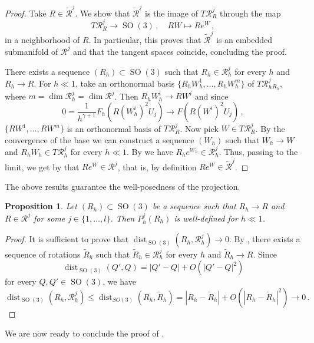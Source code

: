 \documentclass{article}
\theoremstyle{plain}
\theoremstyle{plain}
\theoremstyle{plain}
\theoremstyle{plain}
\theoremstyle{plain}
\newtheorem{prop}[teo]{Proposition}
\theoremstyle{definition}
\theoremstyle{definition}
\DeclareMathOperator{\SO}{SO}
\DeclareMathOperator{\dist}{dist}
\begin{document}
\begin{proof}
	Take $R \in \tilde{\mathcal{R}}^j$. We show that $\tilde{\mathcal{R}}^j$ is the image of $T\mathcal{R}^j_R$ through the map
	\[
		T\mathcal{R}^j_R \to \SO(3)\,, \quad RW \mapsto Re^W\,,
	\]
	in a neighborhood of $R$. In particular, this proves that $\tilde{\mathcal{R}}^j$ is an embedded submanifold of $\mathcal{R}^j$ and that the tangent spaces coincide, concluding the proof. 
	
	There exists a sequence $(R_h) \subset \SO(3)$ such that $R_h \in \mathcal{R}_h^j$ for every $h$ and $R_h \to R$. For $h \ll 1$, take an orthonormal basis $\{R_hW^1_h, \dots, R_hW^m_h\}$ of $T \mathcal{R}_h^j{}_{R_h}$, where $m = \dim\mathcal{R}_h^j = \dim \mathcal{R}^j$. Then $R_h W_h^i \to RW^i$ and since
	\[
		0 = \dfrac{1}{h^{\gamma+1}}F_h(R(W_h^i)^2U_j) \to F(R(W^i)^2U_j)\,,
	\]
	$\{RW^1, \dots, RW^m\}$ is an orthonormal basis of $T\mathcal{R}^j_R$. Now pick $W \in T\mathcal{R}^j_R$. By the convergence of the base we can construct a sequence $(W_h)$ such that $W_h \to W$ and $R_hW_h \in T\mathcal{R}_h^j$ for every $h \ll 1$. By \cite[Lemma 4.4]{MAOR2021} we have $R_he^{W_h} \in \mathcal{R}_h^j$. Thus, passing to the limit, we get by  that $Re^W \in \mathcal{R}^j$, that is, by definition $Re^W \in \tilde{\mathcal{R}}^j$.
\end{proof}

The above results guarantee the well-posedness of the projection.

\begin{prop}\label{prop:projection_well_posed}
	Let $(R_h)	\subset \SO(3)$ be a sequence such that $R_h \to R$ and $R \in \mathcal{R}^j$ for some $j \in \{1, \dots, l\}$. Then $P_h^j(R_h)$ is well-defined for $h \ll 1$.
\end{prop}

\begin{proof}
	It is sufficient to prove that $\dist_{\SO(3)}(R_h, \mathcal{R}_h^j) \to 0$. By , there exists a sequence of rotations $\tilde R_h$ such that $\tilde R_h \in \mathcal{R}_h^j$ for every $h$ and $\tilde R_h \to R$. Since
	\[
	\dist_{\SO(3)}(Q', Q) = |Q' - Q| + O(|Q'-Q|^2)
	\]
	for every $Q, Q' \in \SO(3)$, we have
	\[
		\dist_{\SO(3)}(R_h, \mathcal{R}_h^j) \leq \dist_{SO(3)}(R_h, \tilde R_h) = |R_h - \tilde R_h| + O(|R_h-\tilde R_h|^2) \to 0 \,.
	\]
\end{proof}

We are now ready to conclude the proof of .
\end{document}
